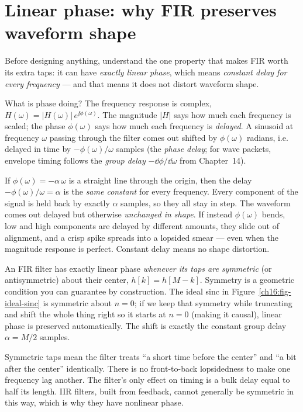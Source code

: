 \section{Linear phase: why FIR preserves waveform shape}
\label{ch16:linphase}

Before designing anything, understand the one property that makes FIR worth its
extra taps: it can have \emph{exactly linear phase}, which means \emph{constant
delay for every frequency} --- and that means it does not distort waveform shape.

What is phase doing? The frequency response is complex,
$H(\omega) = |H(\omega)|\,e^{\jj\phi(\omega)}$. The magnitude $|H|$ says how much
each frequency is scaled; the phase $\phi(\omega)$ says how much each frequency is
\emph{delayed}. A sinusoid at frequency $\omega$ passing through the filter comes
out shifted by $\phi(\omega)$ radians, i.e. delayed in time by
$-\phi(\omega)/\omega$ samples (the \emph{phase delay}; for wave packets, envelope timing follows the \emph{group delay} $-\dd\phi/\dd\omega$ from Chapter~14).

\begin{whybox}
If $\phi(\omega) = -\alpha\,\omega$ is a straight line through the origin, then the
delay $-\phi(\omega)/\omega = \alpha$ is the \emph{same constant} for every
frequency. Every component of the signal is held back by exactly $\alpha$ samples,
so they all stay in step. The waveform comes out delayed but otherwise
\emph{unchanged in shape}. If instead $\phi(\omega)$ bends, low and high
components are delayed by different amounts, they slide out of alignment, and a
crisp spike spreads into a lopsided smear --- even when the magnitude response is
perfect. Constant delay means no shape distortion.
\end{whybox}

An FIR filter has exactly linear phase \emph{whenever its taps
are symmetric} (or antisymmetric) about their center, $h[k] = h[M-k]$. Symmetry is
a geometric condition you can guarantee by construction. The ideal sinc in
Figure~\ref{ch16:fig-ideal-sinc} is symmetric about $n=0$; if we keep that
symmetry while truncating and shift the whole thing right so it starts at
$n=0$ (making it causal), linear phase is preserved automatically. The shift is
exactly the constant group delay $\alpha = M/2$ samples.

\begin{intuitionbox}
Symmetric taps mean the filter treats ``a short time before the center'' and ``a bit
after the center'' identically. There is no front-to-back lopsidedness to make one
frequency lag another. The filter's only effect on timing is a bulk delay equal to
half its length. IIR filters, built from feedback, cannot generally be symmetric
in this way, which is why they have nonlinear phase.
\end{intuitionbox}

